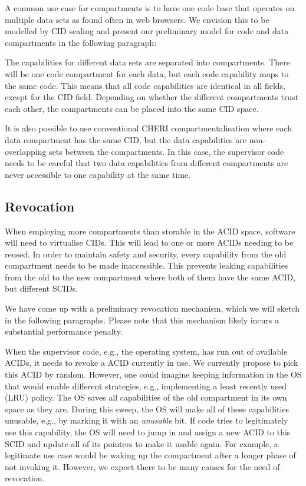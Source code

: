 A common use case for compartments is to have one code base that operates on multiple data sets as found often in web browsers.
We envision this to be modelled by CID sealing and present our preliminary model for code and data compartments in the following paragraph:

The capabilities for different data sets are separated into compartments.
There will be one code compartment for each data, but each code capability maps to the same code.
This means that all code capabilities are identical in all fields, except for the CID field.
Depending on whether the different compartments trust each other, the compartments can be placed into the same CID space.

It is also possible to use conventional CHERI compartmentalisation where each data compartment has the same CID, but the data capabilities are non-overlapping sets between the compartments.
In this case, the supervisor code needs to be careful that two data capabilities from different compartments are never accessible to one capability at the same time.

\subsection{Revocation}

When employing more compartments than storable in the ACID space, software will need to virtualise CIDs.
This will lead to one or more ACIDs needing to be reused.
In order to maintain safety and security, every capability from the old compartment needs to be made inaccessible.
This prevents leaking capabilities from the old to the new compartment where both of them have the same ACID, but different SCIDs.

We have come up with a preliminary revocation mechanism, which we will sketch in the following paragraphs.
Please note that this mechanism likely incurs a substantial performance penalty.

When the supervisor code, e.g., the operating system, has run out of available ACIDs, it needs to revoke a ACID currently in use.
We currently propose to pick this ACID by random.
However, one could imagine keeping information in the OS that would enable different strategies, e.g., implementing a least recently used (LRU) policy.
The OS saves all capabilities of the old compartment in its own space as they are.
During this sweep, the OS will make all of these capabilities unusable, e.g., by marking it with an \textit{unusable} bit.
If code tries to legitimately use this capability, the OS will need to jump in and assign a new ACID to this SCID and update all of its pointers to make it usable again.
For example, a legitimate use case would be waking up the compartment after a longer phase of not invoking it.
However, we expect there to be many causes for the need of revocation.


